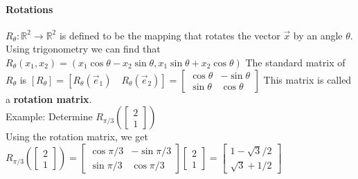 \documentclass[10pt,letter]{article}
\begin{document}
\paragraph{Rotations} $R_\theta:\mathbb{R}^2\rightarrow\mathbb{R}^2$ is defined to be the mapping that rotates the vector $\vec{x}$ by an angle $\theta$. Using trigonometry we can find that $R_\theta(x_1,x_2)=(x_1\cos\theta-x_2\sin\theta, x_1\sin\theta+x_2\cos\theta)$ The standard matrix of $R_\theta$ is $[R_\theta]=[R_\theta(\vec{e}_1)\quad R_\theta(\vec{e}_2)] = \begin{bmatrix}\cos\theta&-\sin\theta\\\sin\theta&\cos\theta\end{bmatrix}$ This matrix is called a \textbf{rotation matrix}. \\ 
Example: Determine $R_{\pi/3}\left(\begin{bmatrix}2\\1\end{bmatrix}\right)$ \\ 
Using the rotation matrix, we get $R_{\pi/3}\left(\begin{bmatrix}2\\1\end{bmatrix}\right)=\begin{bmatrix}\cos\pi/3&-\sin\pi/3\\\sin\pi/3&\cos\pi/3\end{bmatrix}\begin{bmatrix}2\\1\end{bmatrix} = \begin{bmatrix}1-\sqrt{3}/2\\\sqrt{3}+1/2\end{bmatrix}$
\end{document}
